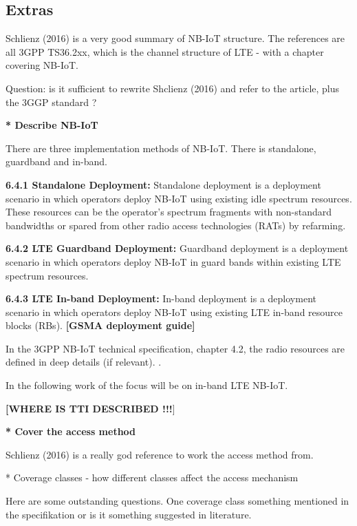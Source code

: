\documentclass[10pt,a4paper,titlepage,twoside]{article}
\newcommand{\tilv}[1]{\textbf{\color{ymagreen}[#1]}}
\newcommand{\note}[1]{\textbf{[\color{ymablue}#1}]}
\newcommand{\point}[1]{\textbf{\color{ymared} #1}}
\begin{document}
\subsection{Extras}

Schlienz (2016) \cite{schlienz} is a very good summary of NB-IoT structure. The references are all 3GPP TS36.2xx, which is the channel structure of LTE - with a chapter covering NB-IoT.

Question: is it sufficient to rewrite Shclienz (2016) and refer to the article, plus the 3GGP standard ?

\point{* Describe NB-IoT}

There are three implementation methods of NB-IoT. There is standalone, guardband and in-band.

\textbf{6.4.1 Standalone Deployment:}
Standalone deployment is a deployment scenario in which operators deploy NB-IoT using
existing idle spectrum resources. These resources can be the operator’s spectrum
fragments with non-standard bandwidths or spared from other radio access technologies
(RATs) by refarming.

\textbf{6.4.2 LTE Guardband Deployment:}
Guardband deployment is a deployment scenario in which operators deploy NB-IoT in guard
bands within existing LTE spectrum resources.

\textbf{6.4.3 LTE In-band Deployment:}
In-band deployment is a deployment scenario in which operators deploy NB-IoT using
existing LTE in-band resource blocks (RBs).
\tilv{GSMA deployment guide}


In the 3GPP NB-IoT technical specification, chapter 4.2, the radio resources are defined in deep details (if relevant).
\cite{schlienz}.

In the following work of the focus will be on in-band LTE NB-IoT.

\note{WHERE IS TTI DESCRIBED !!!}

\point{* Cover the access method}

Schlienz (2016) is a really god reference to work the access method from.

* Coverage classes - how different classes affect the access mechanism

Here are some outstanding questions. One coverage class something mentioned in the specifikation or is it something suggested in literature.

\clearpage
\end{document}
